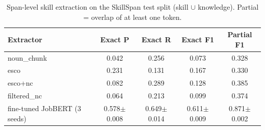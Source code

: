 \begin{table}[t]
\centering
\begin{tabular}{lcccc}
\toprule
Extractor & Exact P & Exact R & Exact F1 & Partial F1 \\
\midrule
noun\_chunk & 0.042 & 0.256 & 0.073 & 0.328 \\
esco & 0.231 & 0.131 & 0.167 & 0.330 \\
esco+nc & 0.082 & 0.289 & 0.128 & 0.385 \\
filtered\_nc & 0.064 & 0.213 & 0.099 & 0.374 \\
fine-tuned JobBERT (3 seeds) & 0.578$\pm$0.008 & 0.649$\pm$0.014 & 0.611$\pm$0.009 & 0.871$\pm$0.002 \\
\bottomrule
\end{tabular}
\caption{Span-level skill extraction on the SkillSpan test split (skill $\cup$ knowledge). Partial = overlap of at least one token.}
\label{tab:extraction}
\end{table}

